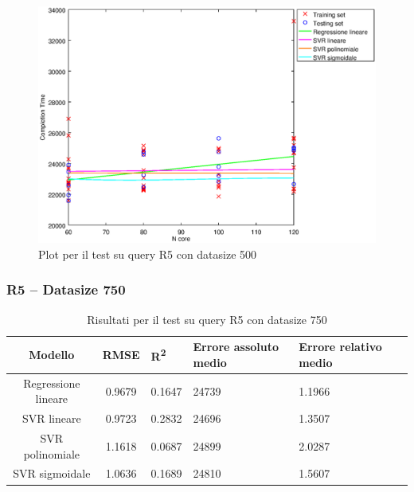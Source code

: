 \documentclass[a4paper,11pt]{article}
\begin{document}
\begin {figure}[hbtp]
\centering
\includegraphics[width=\textwidth]{output/R5_500/plot_R5_500.eps}
\caption {Plot per il test su query R5 con datasize 500}
\end {figure}
\newpage
\subsubsection{R5 -- Datasize 750}
\begin{table}[bhpt]
	\centering
	\begin{adjustbox}{center}
		\begin{tabular}{c | c M{1cm} M{2.5cm} M{2.5cm} M{1.8cm}}
			Modello & RMSE & R\textsuperscript{2} & Errore assoluto medio & Errore relativo medio \tabularnewline
			\hline
			Regressione lineare & 0.9679 & 0.1647 &  24739 & 1.1966 \\
			SVR lineare & 0.9723 & 0.2832 &  24696 & 1.3507 \\
			SVR polinomiale & 1.1618 & 0.0687 &  24899 & 2.0287 \\
			SVR sigmoidale & 1.0636 & 0.1689 &  24810 & 1.5607 \\
		\end{tabular}
	\end{adjustbox}
	\\
	\caption{Risultati per il test su query R5 con datasize 750}
	\label{table_R5_750}
\end{table}
\end{document}
